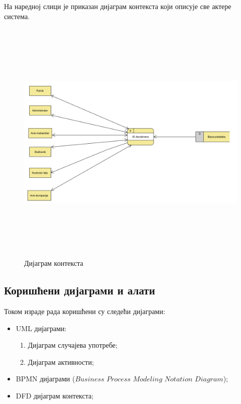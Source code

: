 \documentclass{article}
\begin{document}
На наредној слици је приказан дијаграм контекста који описује све актере система.

\begin{figure}[H]
    \begin{center}
        \includegraphics[width=1.1\textwidth, height=12cm]{Dijagrami_slike/dijagram_konteksta.png}
       \caption{Дијаграм контекста}
    \end{center}
\end{figure}


\subsection{Коришћени дијаграми и алати}
Током израде рада коришћени су следећи дијаграми:
\begin{itemize}
    \item UML дијаграми:
        \begin{enumerate}
            \item Дијаграм случајева употребе;
            \item Дијаграм активности;
        \end{enumerate}
    \item BPMN дијаграми ($Business$ $Process$ $Modeling$ $Notation$ $Diagram$);
    \item DFD дијаграм контекста;
\end{itemize}
\end{document}
